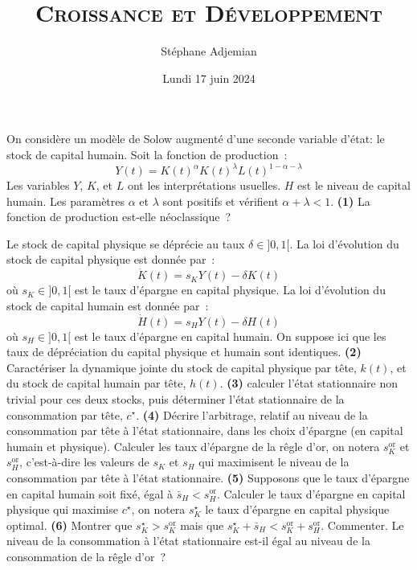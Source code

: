 \documentclass[12pt,a4paper,notitlepage]{article}
\newcommand{\question}[1]{\textbf{(#1)}}
\begin{document}
\title{\textsc{Croissance et Développement}}
\author{Stéphane Adjemian}
\date{Lundi 17 juin 2024}

\maketitle
\thispagestyle{empty}



On considère un modèle de Solow
augmenté d'une seconde variable d'état: le stock de capital humain.
Soit la fonction de production :
\[
Y(t) = K(t)^{\alpha}K(t)^{\lambda}L(t)^{1-\alpha-\lambda}
\]
Les variables $Y$,  $K$, et $L$ ont  les interprétations usuelles.
$H$ est le niveau de capital humain. Les paramètres $\alpha$ et
$\lambda$ sont  positifs et  vérifient $\alpha+\lambda<1$. \question{1} La fonction de production est-elle néoclassique~?\newline

Le  stock de
capital physique se  déprécie au taux $\delta\in]0,1[$.   La loi d'évolution
du stock de capital physique est donnée par :
\[
\dot{K}(t) = s_{K} Y(t) - \delta K(t)
\]
où $s_{K}\in]0,1[$ est le taux d'épargne en capital physique. La loi
d'évolution du stock de capital humain est donnée par :
\[
\dot{H}(t) = s_{H} Y(t) - \delta H(t)
\]
où $s_{H}\in]0,1[$ est le taux d'épargne en capital humain. On suppose
ici que les taux de dépréciation du capital physique et humain sont
identiques. \question{2} Caractériser la dynamique jointe du stock de
capital physique par tête, $k(t)$, et du stock de capital humain par
tête, $h(t)$. \question{3} calculer l'état stationnaire non trivial
pour ces deux stocks, puis déterminer l'état stationnaire de la
consommation par tête, $c^{\star}$.  \question{4} Décrire l'arbitrage,
relatif au niveau de la consommation par tête à l'état stationnaire,
dans les choix d'épargne (en capital humain et physique). Calculer les
taux d'épargne de la rêgle d'or, on notera $s_{K}^{\mathrm{or}}$
et $s_{H}^{\mathrm{or}}$, c'est-à-dire les valeurs de $s_{K}$
et $s_{H}$ qui maximisent le niveau de la consommation par tête à
l'état stationnaire. \question{5} Supposons que le taux d'épargne en
capital humain soit fixé, égal
à $\bar{s}_{H}<s_{H}^{\mathrm{or}}$. Calculer le taux d'épargne en
capital physique qui maximise $c^{\star}$, on notera $s_{K}^{\star}$
le taux d'épargne en capital physique optimal. \question{6} Montrer
que $s_{K}^{\star}>s_{K}^{\mathrm{or}}$ mais
que
$s_{K}^{\star}+\bar{s}_{H}<s_{K}^{\mathrm{or}}+s_{H}^{\mathrm{or}}$. Commenter. Le
niveau de la consommation à l'état stationnaire est-il égal au niveau
de la consommation de la rêgle d'or~?
\end{document}
